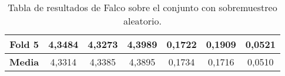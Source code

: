 \begin{table}[H]
{\begin{tabular}{|ccccccc|}
\multicolumn{1}{|c|}{\textbf{Fold 5}} & \multicolumn{1}{c|}{4,3484}            & \multicolumn{1}{c|}{4,3273}              & \multicolumn{1}{c|}{4,3989}          & \multicolumn{1}{c|}{0,1722}            & \multicolumn{1}{c|}{0,1909}              & 0,0521          \\ \hline
\multicolumn{1}{|c|}{\textbf{Media}}  & \multicolumn{1}{c|}{4,3314}            & \multicolumn{1}{c|}{4,3385}              & \multicolumn{1}{c|}{4,3895}          & \multicolumn{1}{c|}{0,1734}            & \multicolumn{1}{c|}{0,1716}              & 0,0510          \\ \hline
\end{tabular}%
}
\caption{Tabla de resultados de Falco sobre el conjunto con sobremuestreo aleatorio.}\label{tablaFALCOdefecto}
\end{table}


